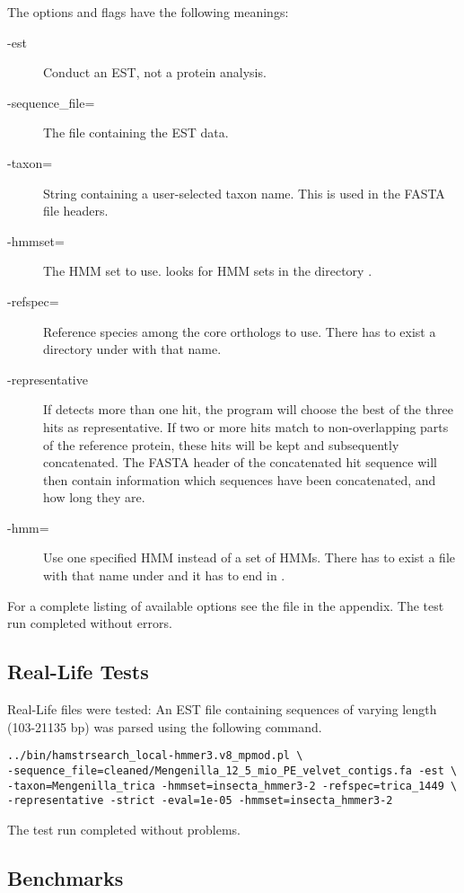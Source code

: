 The options and flags have the following meanings:
\begin{description}
	\item[-est] Conduct an EST, not a protein analysis.
	\item[-sequence\_file=] The file containing the EST data.
	\item[-taxon=] String containing a user-selected taxon name. This is used in the FASTA file headers.
	\item[-hmmset=] The HMM set to use. \hamstr looks for HMM sets in the directory .
	\item[-refspec=] Reference species among the core orthologs to use. There has to exist a directory under  with that name.
	\item[-representative] If \hamstr detects more than one hit, the program will choose the best of the three hits as representative. If two or more hits match to non-overlapping parts of the reference protein, these hits will be kept and subsequently concatenated. The FASTA header of the concatenated hit sequence will then contain information which sequences have been concatenated, and how long they are.
	\item[-hmm=] Use one specified HMM instead of a set of HMMs. There has to exist a file with that name under  and it has to end in .
\end{description}
For a complete listing of available options see the \hamstr {} file in the appendix. The test run completed without errors.

\subsection{Real-Life Tests}

Real-Life files were tested: An EST file containing sequences of varying length (103-21135 bp) was parsed using the following command.

\begin{verbatim}
../bin/hamstrsearch_local-hmmer3.v8_mpmod.pl \
-sequence_file=cleaned/Mengenilla_12_5_mio_PE_velvet_contigs.fa -est \
-taxon=Mengenilla_trica -hmmset=insecta_hmmer3-2 -refspec=trica_1449 \
-representative -strict -eval=1e-05 -hmmset=insecta_hmmer3-2 
\end{verbatim}

The test run completed without problems.

\subsection{Benchmarks}

